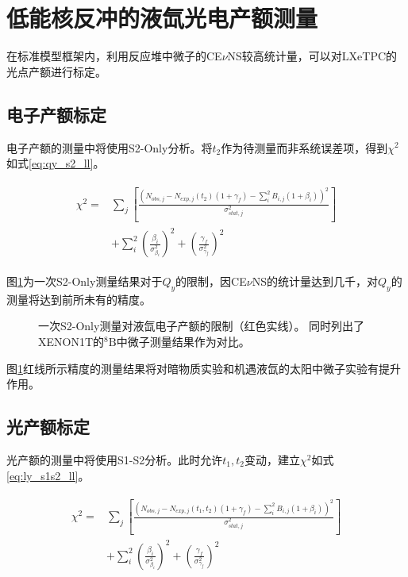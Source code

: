 \section{低能核反冲的液氙光电产额测量}

在标准模型框架内，利用反应堆中微子的CE$\nu$NS较高统计量，可以对LXeTPC的光点产额进行标定。

\subsection{电子产额标定}

电子产额的测量中将使用S2-Only分析。将$t_2$作为待测量而非系统误差项，得到$\chi^2$如式\ref{eq:qy_s2_ll}。

\begin{align}
    \label{eq:qy_s2_ll}
    \begin{split}
    \chi^2 =& \sum_j\left[\frac{\left(N_{obs,j} - N_{exp,j}(t_2)(1 + \gamma_f) 
    - \sum_{i}^2 B_{i,j}(1 + \beta_i)\right)^2}{\sigma^2_{stat,j}}\right] \\
    & + \sum_{i}^2(\frac{\beta_i}{\sigma^2_{\beta_i}})^2 + (\frac{\gamma_f}{\sigma^2_{\gamma_f}})^2
    \end{split}
\end{align}

图\ref{fig:qy_sensitivity_s2only}为一次S2-Only测量结果对于$Q_y$的限制，因CE$\nu$NS的统计量达到几千，对$Q_y$的测量将达到前所未有的精度。

\begin{figure}
  \centering
  
  \caption{\label{fig:qy_sensitivity_s2only} 一次S2-Only测量对液氙电子产额的限制（红色实线）。
  同时列出了XENON1T的${}^{8}\mathrm{B}$中微子测量结果作为对比\cite{aprile_search_2021}。}
\end{figure}

图\ref{fig:qy_sensitivity_s2only}红线所示精度的测量结果将对暗物质实验和机遇液氙的太阳中微子实验有提升作用。

\subsection{光产额标定}

光产额的测量中将使用S1-S2分析。此时允许$t_1,t_2$变动，建立$\chi^2$如式\ref{eq:ly_s1s2_ll}。

\begin{align}
    \label{eq:ly_s1s2_ll}
    \begin{split}
    \chi^2 =& \sum_j\left[\frac{\left(N_{obs,j} - N_{exp,j}(t_1,t_2)(1 + \gamma_f) 
    - \sum_{i}^2 B_{i,j}(1 + \beta_i)\right)^2}{\sigma^2_{stat,j}}\right] \\
    & + \sum_{i}^2(\frac{\beta_i}{\sigma^2_{\beta_i}})^2 + (\frac{\gamma_f}{\sigma^2_{\gamma_f}})^2
    \end{split}
\end{align}

